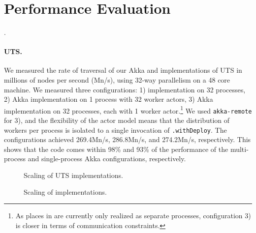 \section{Performance Evaluation}
\label{sec:perf}

\paragraph{\kmeans}. \TODO

\paragraph{UTS.} We measured the rate of traversal of our Akka and
\apgas implementations of UTS in millions of nodes per second (Mn/s), using
32-way parallelism on a 48 core machine. We measured three configurations: 1)
\apgas implementation on 32 processes, 2) Akka implementation on 1 process with
32 worker actors, 3) Akka implementation on 32 processes, each with 1 worker
actor.\footnote{As places in \apgas are currently only realized as separate
processes, configuration 3) is closer in terms of communication constraints.}
We used \lstinline{akka-remote} for 3), and the flexibility of the actor model
means that the distribution of workers per process is isolated to a single
invocation of \lstinline{.withDeploy}. The configurations achieved 269.4Mn/s,
286.8Mn/s, and 274.2Mn/s, respectively. This shows that the \apgas code comes
within 98\% and 93\% of the performance of the multi-process and single-process
Akka configurations, respectively.

\begin{figure}
\vspace{-0.3cm}
\hspace{-0.2cm}
\begingroup\graphicspath{{figures/}}\endgroup
\vspace{-0.2cm}
\caption{Scaling of UTS implementations.}
\label{fig:uts-scaling}
\end{figure}

\begin{figure}
\vspace{-0.3cm}
\hspace{-0.2cm}
\begingroup\graphicspath{{figures/}}\endgroup
\vspace{-0.2cm}
\caption{Scaling of \kmeans implementations.}
\label{fig:uts-scaling}
\end{figure}

